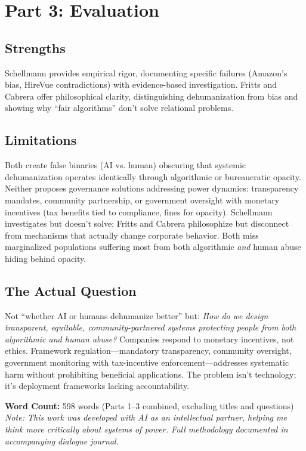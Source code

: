 \documentclass[11pt,twoside]{article}
\begin{document}
\section{Part 3: Evaluation}

\subsection{Strengths}
Schellmann provides empirical rigor, documenting specific failures (Amazon's bias, HireVue contradictions) with evidence-based investigation. Fritts and Cabrera offer philosophical clarity, distinguishing dehumanization from bias and showing why \enquote{fair algorithms} don't solve relational problems.

\subsection{Limitations}
Both create false binaries (AI vs. human) obscuring that systemic dehumanization operates identically through algorithmic or bureaucratic opacity. Neither proposes governance solutions addressing power dynamics: transparency mandates, community partnership, or government oversight with monetary incentives (tax benefits tied to compliance, fines for opacity). Schellmann investigates but doesn't solve; Fritts and Cabrera philosophize but disconnect from mechanisms that actually change corporate behavior. Both miss marginalized populations suffering most from both algorithmic \textit{and} human abuse hiding behind opacity.

\subsection{The Actual Question}
Not \enquote{whether AI or humans dehumanize better} but: \textit{How do we design transparent, equitable, community-partnered systems protecting people from both algorithmic and human abuse?} Companies respond to monetary incentives, not ethics. Framework regulation—mandatory transparency, community oversight, government monitoring with tax-incentive enforcement—addresses systematic harm without prohibiting beneficial applications. The problem isn't technology; it's deployment frameworks lacking accountability.

\vfill
\noindent\centering\footnotesize\textbf{Word Count:} 598 words (Parts 1--3 combined, excluding titles and questions)\\
\textit{Note: This work was developed with AI as an intellectual partner, helping me think more critically about systems of power. Full methodology documented in accompanying dialogue journal.}
\end{document}
